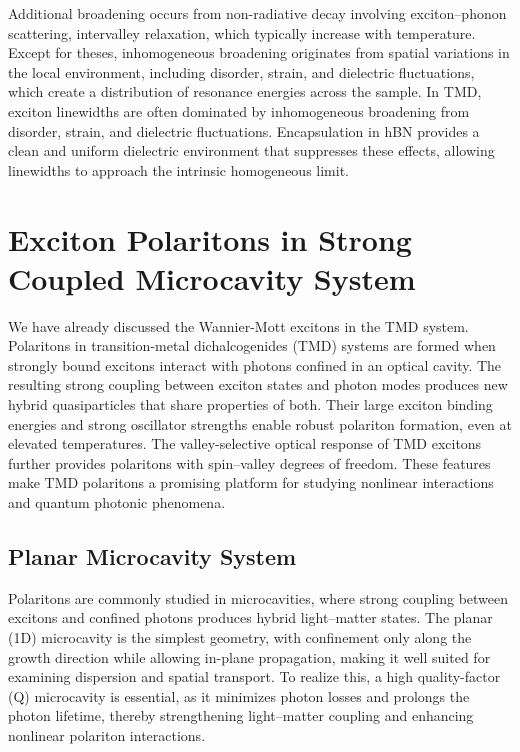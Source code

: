 Additional broadening occurs from non-radiative decay involving exciton--phonon scattering, intervalley relaxation, which typically increase with temperature\cite{Cadiz2017-ly,Robert2018-if,Ajayi2017-ky,Moody2015-iz}.
Except for theses, inhomogeneous broadening originates from spatial variations in the local environment, including disorder, strain, and dielectric fluctuations, which create a distribution of resonance energies across the sample\cite{Jakubczyk2019-wv}.
In TMD, exciton linewidths are often dominated by inhomogeneous broadening from disorder, strain, and dielectric fluctuations.
Encapsulation in hBN provides a clean and uniform dielectric environment that suppresses these effects, allowing linewidths to approach the intrinsic homogeneous limit\cite{Jakubczyk2019-wv,Wang2018-my}.

\section{Exciton Polaritons in Strong Coupled Microcavity System}
We have already discussed the Wannier-Mott excitons in the TMD system.
Polaritons in transition-metal dichalcogenides (TMD) systems are formed when strongly bound excitons interact with photons confined in an optical cavity\cite{Deng2010-ul}. 
The resulting strong coupling between exciton states and photon modes produces new hybrid quasiparticles that share properties of both.
Their large exciton binding energies and strong oscillator strengths enable robust polariton formation, even at elevated temperatures\cite{Liu2015-hm}.
The valley-selective optical response of TMD excitons further provides polaritons with spin–valley degrees of freedom\cite{LaMountain2021-ck,Chen2017-tc}.
These features make TMD polaritons a promising platform for studying nonlinear interactions and quantum photonic phenomena\cite{Gu2024-ul}.

\subsection{Planar Microcavity System}
Polaritons are commonly studied in microcavities, where strong coupling between excitons and confined photons produces hybrid light–matter states\cite{Rahimi-Iman2020-tt,Deng2010-ul}. 
The planar (1D) microcavity is the simplest geometry, with confinement only along the growth direction while allowing in-plane propagation, making it well suited for examining dispersion and spatial transport. 
To realize this, a high quality-factor (Q) microcavity\cite{Vahala2003-yh} is essential, as it minimizes photon losses and prolongs the photon lifetime, thereby strengthening light–matter coupling and enhancing nonlinear polariton interactions\cite{Gu2021-cu,Emmanuele2020-oh,Louca2023-in,Datta2022-po,Lopriore2025-yd,Sigurdsson2024-nm}. 

